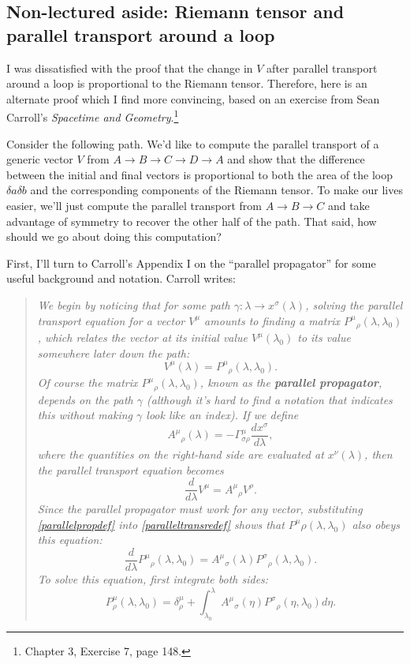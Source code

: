 \subsection*{Non-lectured aside: Riemann tensor and parallel transport around a loop}

I was dissatisfied with the proof that the change in $V$ after parallel transport around a loop is proportional to the Riemann tensor. Therefore, here is an alternate proof which I find more convincing, based on an exercise from Sean Carroll's \textit{Spacetime and Geometry}.\footnote{Chapter 3, Exercise 7, page 148.}

Consider the following path.%
We'd like to compute the parallel transport of a generic vector $V$ from $A\to B\to C \to D \to A$ and show that the difference between the initial and final vectors is proportional to both the area of the loop $\delta a \delta b$ and the corresponding components of the Riemann tensor. To make our lives easier, we'll just compute the parallel transport from $A\to B \to C$ and take advantage of symmetry to recover the other half of the path. That said, how should we go about doing this computation?

First, I'll turn to Carroll's Appendix I on the ``parallel propagator'' for some useful background and notation. Carroll writes:
\begin{quotation}
\textit{We begin by noticing that for some path $\gamma:\lambda \to x^\sigma(\lambda)$, solving the parallel transport equation for a vector $V^\mu$ amounts to finding a matrix ${P^\mu}_\rho(\lambda,\lambda_0)$, which relates the vector at its initial value $V^\mu(\lambda_0)$ to its value somewhere later down the path:
\begin{equation}\label{parallelpropdef}
V^\mu(\lambda)={P^\mu}_\rho(\lambda,\lambda_0).
\end{equation}
Of course the matrix ${P^\mu}_\rho(\lambda,\lambda_0)$, known as the \textbf{parallel propagator}, depends on the path $\gamma$ (although it's hard to find a notation that indicates this without making $\gamma$ look like an index). If we define
$${A^\mu}_\rho(\lambda)=-\Gamma^\mu_{\sigma\rho}\frac{dx^\sigma}{d\lambda},$$ where the quantities on the right-hand side are evaluated at $x^\nu(\lambda)$, then the parallel transport equation becomes
\begin{equation}\label{paralleltransredef}
\frac{d}{d\lambda}V^\mu ={A^\mu}_\rho V^\rho.
\end{equation}
Since the parallel propagator must work for any vector, substituting \ref{parallelpropdef} into \ref{paralleltransredef} shows that ${P^\mu}\rho(\lambda,\lambda_0)$ also obeys this equation:
$$\frac{d}{d\lambda}{P^\mu}_\rho(\lambda,\lambda_0)={A^\mu}_\sigma(\lambda){P^\sigma}_\rho(\lambda,\lambda_0).$$
To solve this equation, first integrate both sides:
$$P^\mu_\rho(\lambda,\lambda_0)=\delta^\mu_\rho+\int_{\lambda_0}^\lambda {A^\mu}_\sigma(\eta){P^\sigma}_\rho(\eta,\lambda_0)d\eta.$$
}
\end{quotation}

